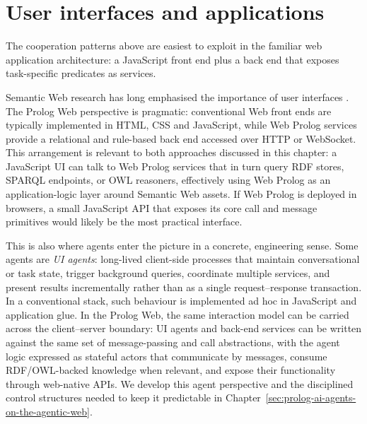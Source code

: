 %
%
%

\section{User interfaces and applications}\label{sec:user-interface}

The cooperation patterns above are easiest to exploit in the familiar web application architecture: a JavaScript front end plus a back end that exposes task-specific predicates as services.

Semantic Web research has long emphasised the importance of user interfaces \citep{Gasevic12semanticweb}. The Prolog Web perspective is pragmatic: conventional Web front ends are typically implemented in HTML, CSS and JavaScript, while Web Prolog services provide a relational and rule-based back end accessed over HTTP or WebSocket. This arrangement is relevant to both approaches discussed in this chapter: a JavaScript UI can talk to Web Prolog services that in turn query RDF stores, SPARQL endpoints, or OWL reasoners, effectively using Web Prolog as an application-logic layer around Semantic Web assets. If Web Prolog is deployed in browsers, a small JavaScript API that exposes its core call and message primitives would likely be the most practical interface.

This is also where agents enter the picture in a concrete, engineering sense. Some agents are \emph{UI agents}: long-lived client-side processes that maintain conversational or task state, trigger background queries, coordinate multiple services, and present results incrementally rather than as a single request--response transaction. In a conventional stack, such behaviour is implemented ad hoc in JavaScript and application glue. In the Prolog Web, the same interaction model can be carried across the client--server boundary: UI agents and back-end services can be written against the same set of message-passing and call abstractions, with the agent logic expressed as stateful actors that communicate by messages, consume RDF/OWL-backed knowledge when relevant, and expose their functionality through web-native APIs. We develop this agent perspective and the disciplined control structures needed to keep it predictable in Chapter~\ref{sec:prolog-ai-agents-on-the-agentic-web}.

